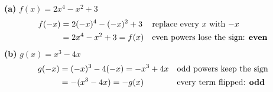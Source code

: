 \documentclass[aspectratio=169, 11pt]{beamer}
\begin{document}
\begin{frame}[t, plain]
  \textbf{(a)} $f(x)=2x^4-x^2+3$ \pause
  \[
  \begin{aligned}
    f(-x) &= 2(-x)^4-(-x)^2+3 && \text{replace every $x$ with $-x$} \\
          &= 2x^4-x^2+3=f(x) && \text{even powers lose the sign: \textbf{even}}
  \end{aligned}
  \]
  \pause
  \textbf{(b)} $g(x)=x^3-4x$ \pause
  \[
  \begin{aligned}
    g(-x) &= (-x)^3-4(-x)=-x^3+4x && \text{odd powers keep the sign} \\
          &= -(x^3-4x)=-g(x) && \text{every term flipped: \textbf{odd}}
  \end{aligned}
  \]
\end{frame}
\end{document}
